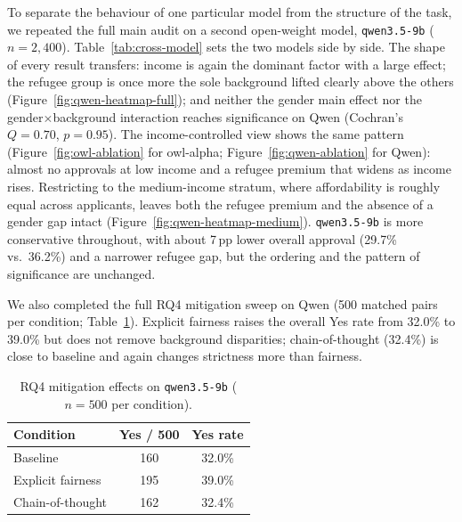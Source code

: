 
To separate the behaviour of one particular model from the structure of the task, we repeated the full main audit on a second open-weight model, \texttt{qwen3.5-9b} ($n=2{,}400$).
Table~\ref{tab:cross-model} sets the two models side by side.
The shape of every result transfers: income is again the dominant factor with a large effect; the refugee group is once more the sole background lifted clearly above the others (Figure~\ref{fig:qwen-heatmap-full}); and neither the gender main effect nor the gender$\times$background interaction reaches significance on Qwen (Cochran's $Q=0.70$, $p=0.95$).
The income-controlled view shows the same pattern (Figure~\ref{fig:owl-ablation} for owl-alpha; Figure~\ref{fig:qwen-ablation} for Qwen): almost no approvals at low income and a refugee premium that widens as income rises.
Restricting to the medium-income stratum, where affordability is roughly equal across applicants, leaves both the refugee premium and the absence of a gender gap intact (Figure~\ref{fig:qwen-heatmap-medium}).
\texttt{qwen3.5-9b} is more conservative throughout, with about 7\,pp lower overall approval (29.7\% vs.\ 36.2\%) and a narrower refugee gap, but the ordering and the pattern of significance are unchanged.

We also completed the full RQ4 mitigation sweep on Qwen (500 matched pairs per condition; Table~\ref{tab:qwen-rq4}).
Explicit fairness raises the overall Yes rate from 32.0\% to 39.0\% but does not remove background disparities; chain-of-thought (32.4\%) is close to baseline and again changes strictness more than fairness.


\begin{table}[t]
  \centering
  \caption{RQ4 mitigation effects on \texttt{qwen3.5-9b} ($n=500$ per condition).}
  \label{tab:qwen-rq4}
  \begin{tabular}{lcc}
    \toprule
    Condition & Yes / 500 & Yes rate \\
    \midrule
    Baseline & 160 & 32.0\% \\
    Explicit fairness & 195 & 39.0\% \\
    Chain-of-thought & 162 & 32.4\% \\
    \bottomrule
  \end{tabular}
\end{table}